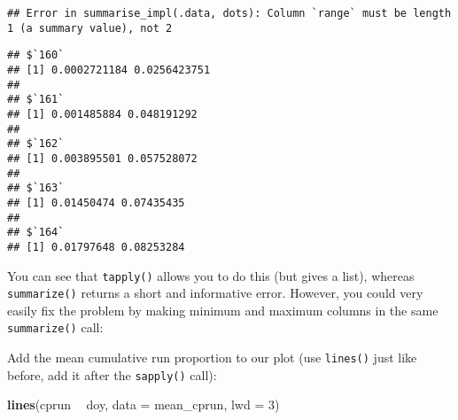 \documentclass[]{book}
\newenvironment{Shaded}{\begin{snugshade}}{\end{snugshade}}
\newcommand{\KeywordTok}[1]{\textcolor[rgb]{0.13,0.29,0.53}{\textbf{#1}}}
\newcommand{\DataTypeTok}[1]{\textcolor[rgb]{0.13,0.29,0.53}{#1}}
\newcommand{\DecValTok}[1]{\textcolor[rgb]{0.00,0.00,0.81}{#1}}
\newcommand{\StringTok}[1]{\textcolor[rgb]{0.31,0.60,0.02}{#1}}
\newcommand{\CommentTok}[1]{\textcolor[rgb]{0.56,0.35,0.01}{\textit{#1}}}
\newcommand{\OperatorTok}[1]{\textcolor[rgb]{0.81,0.36,0.00}{\textbf{#1}}}
\newcommand{\NormalTok}[1]{#1}
\theoremstyle{definition}
\theoremstyle{definition}
\theoremstyle{definition}
\theoremstyle{remark}
\begin{document}
\begin{verbatim}
## Error in summarise_impl(.data, dots): Column `range` must be length 1 (a summary value), not 2
\end{verbatim}

\begin{Shaded}
\end{Shaded}

\begin{verbatim}
## $`160`
## [1] 0.0002721184 0.0256423751
## 
## $`161`
## [1] 0.001485884 0.048191292
## 
## $`162`
## [1] 0.003895501 0.057528072
## 
## $`163`
## [1] 0.01450474 0.07435435
## 
## $`164`
## [1] 0.01797648 0.08253284
\end{verbatim}

You can see that \texttt{tapply()} allows you to do this (but gives a
list), whereas \texttt{summarize()} returns a short and informative
error. However, you could very easily fix the problem by making minimum
and maximum columns in the same \texttt{summarize()} call:

\begin{Shaded}
\end{Shaded}

Add the mean cumulative run proportion to our plot (use \texttt{lines()}
just like before, add it after the \texttt{sapply()} call):

\begin{Shaded}
\begin{Highlighting}[]
\KeywordTok{lines}\NormalTok{(cprun }\OperatorTok{~}\StringTok{ }\NormalTok{doy, }\DataTypeTok{data =}\NormalTok{ mean_cprun, }\DataTypeTok{lwd =} \DecValTok{3}\NormalTok{)}
\end{Highlighting}
\end{Shaded}
\end{document}
